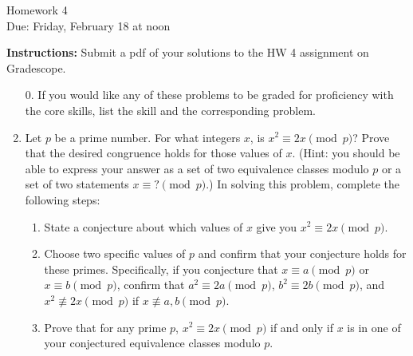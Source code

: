 \documentclass[12pt]{article}
\begin{document}
\begin{center}
{\Large Homework 4}\\
Due: Friday,  February 18 at noon\\


\end{center}
{\bf Instructions:} Submit a pdf of your solutions to the HW 4 assignment on Gradescope. 



\begin{enumerate}
\item[0.] If you would like any of these problems to be graded for proficiency with the core skills, list the skill and the corresponding problem. 
\item Let $p$ be a prime number.  For what integers $x$, is $x^2\equiv 2x\pmod{p}$? Prove that the desired congruence holds for those values of $x$.  (Hint: you should be able to express your answer as a set of two equivalence classes modulo $p$ or a set of two statements $x\equiv ?\pmod{p}$.) In solving this problem, complete the following steps:
\begin{enumerate}
\item State a conjecture about which values of $x$ give you $x^2\equiv 2x\pmod{p}$.
\item Choose two specific values of $p$ and confirm that your conjecture holds for these primes.  Specifically, if you conjecture that $x\equiv a\pmod{p}$ or $x\equiv b\pmod{p}$, confirm that $a^2\equiv 2a\pmod{p}$, $b^2\equiv2b\pmod{p}$, and $x^2\not\equiv 2x\pmod{p}$ if $x\not\equiv a,b\pmod{p}$. 
\item Prove that for any prime $p$, $x^2\equiv 2x\pmod{p}$ if and only if $x$ is in one of your conjectured equivalence classes modulo $p$. 
\end{enumerate}


\end{enumerate}
\end{document}
